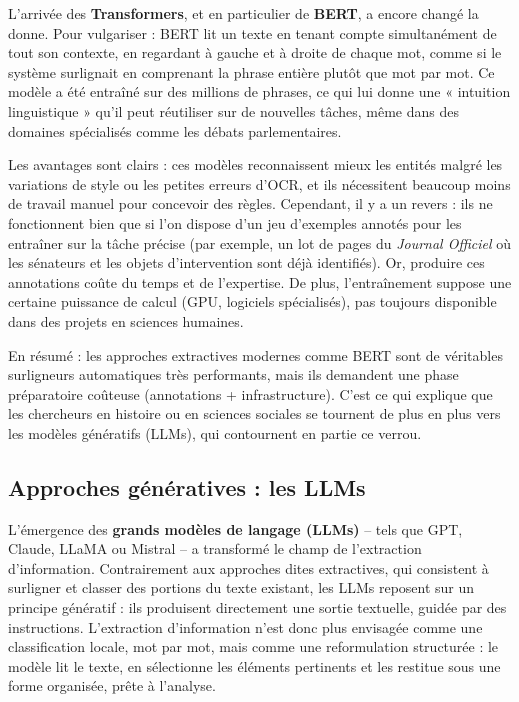 L’arrivée des \textbf{Transformers}, et en particulier de \textbf{BERT}, a encore changé la donne. Pour vulgariser : BERT lit un texte en tenant compte simultanément de tout son contexte, en regardant à gauche et à droite de chaque mot, comme si le système surlignait en comprenant la phrase entière plutôt que mot par mot. Ce modèle a été entraîné sur des millions de phrases, ce qui lui donne une « intuition linguistique » qu’il peut réutiliser sur de nouvelles tâches, même dans des domaines spécialisés comme les débats parlementaires.

Les avantages sont clairs : ces modèles reconnaissent mieux les entités malgré les variations de style ou les petites erreurs d’OCR, et ils nécessitent beaucoup moins de travail manuel pour concevoir des règles. Cependant, il y a un revers : ils ne fonctionnent bien que si l’on dispose d’un jeu d’exemples annotés pour les entraîner sur la tâche précise (par exemple, un lot de pages du \emph{Journal Officiel} où les sénateurs et les objets d’intervention sont déjà identifiés). Or, produire ces annotations coûte du temps et de l’expertise. De plus, l’entraînement suppose une certaine puissance de calcul (GPU, logiciels spécialisés), pas toujours disponible dans des projets en sciences humaines.

En résumé : les approches extractives modernes comme BERT sont de véritables surligneurs automatiques très performants, mais ils demandent une phase préparatoire coûteuse (annotations + infrastructure). C’est ce qui explique que les chercheurs en histoire ou en sciences sociales se tournent de plus en plus vers les modèles génératifs (LLMs), qui contournent en partie ce verrou.

\subsection{Approches génératives : les LLMs}

L’émergence des \textbf{grands modèles de langage (LLMs)} – tels que GPT, Claude, LLaMA ou Mistral – a transformé le champ de l’extraction d’information. Contrairement aux approches dites extractives, qui consistent à surligner et classer des portions du texte existant, les LLMs reposent sur un principe génératif : ils produisent directement une sortie textuelle, guidée par des instructions. L’extraction d’information n’est donc plus envisagée comme une classification locale, mot par mot, mais comme une reformulation structurée : le modèle lit le texte, en sélectionne les éléments pertinents et les restitue sous une forme organisée, prête à l’analyse.

